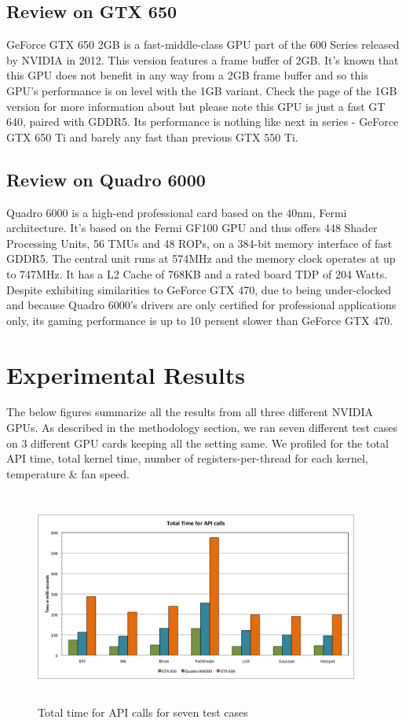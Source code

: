 \documentclass[paper=a4, fontsize=11pt]{scrartcl}
\numberwithin{equation}{section}		%
\numberwithin{figure}{section}			%
\numberwithin{table}{section}				%
\begin{document}
\subsection{Review on GTX 650}
GeForce GTX 650 2GB is a fast-middle-class GPU part of the 600 Series released by NVIDIA in 2012.
This version features a frame buffer of 2GB. It's known that this GPU does not benefit in any way from a 2GB frame buffer and so this GPU's performance is on level with the 1GB variant. Check the page of the 1GB version for more information about but please note this GPU is just a fast GT 640, paired with GDDR5. Its performance is nothing like next in series - GeForce GTX 650 Ti and barely any fast than previous GTX 550 Ti.

\subsection{Review on Quadro 6000}
Quadro 6000 is a high-end professional card based on the 40nm, Fermi architecture. It's based on the Fermi GF100 GPU and thus offers 448 Shader Processing Units, 56 TMUs and 48 ROPs, on a 384-bit memory interface of fast GDDR5. The central unit runs at 574MHz and the memory clock operates at up to 747MHz. It has a L2 Cache of 768KB and a rated board TDP of 204 Watts. 
Despite exhibiting similarities to GeForce GTX 470, due to being under-clocked and because Quadro 6000's drivers are only certified for professional applications only, its gaming performance is up to 10 persent slower than GeForce GTX 470.

\newpage
\section{Experimental Results}

The below figures summarize all the results from all three different NVIDIA GPUs. As described in the methodology section, we ran seven different test cases on 3 different GPU cards keeping all the setting same. We profiled for the total API time, total kernel time, number of registers-per-thread for each kernel, temperature \& fan speed.   

\begin{figure}[!h]
\centering
\includegraphics[width=0.95\textwidth,height=7cm]{../imgs/api_calls.png}
\caption{Total time for API calls for seven test cases}
\label{fig:totalAPI}
\end{figure}
\end{document}
